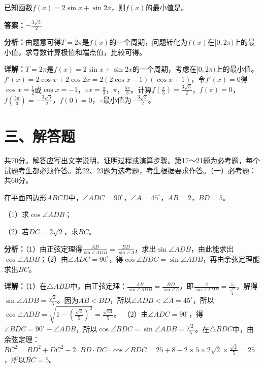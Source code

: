 \begin{question}[points=5]
已知函数$f(x)=2\sin x+\sin 2x$，则$f(x)$的最小值是。
\begin{solution}
\textbf{答案：}$-\frac{3\sqrt{3}}{2}$

\textbf{分析：}由题意可得$T=2\pi$是$f(x)$的一个周期，问题转化为$f(x)$在$[0,2\pi)$上的最小值，求导数计算极值和端点值，比较可得。

\textbf{详解：}$T=2\pi$是$f(x)=2\sin x+\sin2x$的一个周期，考虑在$[0,2\pi)$上的最小值。$f'(x)=2\cos x+2\cos2x=2(2\cos x-1)(\cos x+1)$，令$f'(x)=0$得$\cos x=\frac{1}{2}$或$\cos x=-1$，$\therefore x=\frac{\pi}{3}$，$\pi$，$\frac{5\pi}{3}$。计算$f(\frac{\pi}{3})=\frac{3\sqrt{3}}{2}$，$f(\pi)=0$，$f(\frac{5\pi}{3})=-\frac{3\sqrt{3}}{2}$，$f(0)=0$，$\therefore$最小值为$-\frac{3\sqrt{3}}{2}$。
\end{solution}
\end{question}

\section*{三、解答题}
共70分。解答应写出文字说明、证明过程或演算步骤。第17～21题为必考题，每个试题考生都必须作答。第22、23题为选考题，考生根据要求作答。（一）必考题：共60分。

\begin{question}[points=12]
在平面四边形$ABCD$中，$\angle ADC=90^\circ$，$\angle A=45^\circ$，$AB=2$，$BD=5$。

（1）求$\cos\angle ADB$；

（2）若$DC=2\sqrt{2}$，求$BC$。
\begin{solution}

\textbf{分析：}（1）由正弦定理得$\frac{AB}{\sin\angle ADB}=\frac{BD}{\sin\angle A}$，求出$\sin\angle ADB$，由此能求出$\cos\angle ADB$；（2）由$\angle ADC=90^\circ$，得$\cos\angle BDC=\sin\angle ADB$，再由余弦定理能求出$BC$。

\textbf{详解：}（1）在$\triangle ABD$中，由正弦定理：$\frac{AB}{\sin\angle ADB}=\frac{BD}{\sin\angle A}$，即$\frac{2}{\sin\angle ADB}=\frac{5}{\frac{\sqrt{2}}{2}}$，解得$\sin\angle ADB=\frac{\sqrt{2}}{5}$。因为$AB<BD$，所以$\angle ADB<\angle A=45^\circ$，所以$\cos\angle ADB=\sqrt{1-(\frac{\sqrt{2}}{5})^2}=\frac{\sqrt{23}}{5}$。
（2）由$\angle ADC=90^\circ$，得$\angle BDC=90^\circ-\angle ADB$，所以$\cos\angle BDC=\sin\angle ADB=\frac{\sqrt{2}}{5}$。在$\triangle BDC$中，由余弦定理：$BC^2=BD^2+DC^2-2\cdot BD\cdot DC\cdot\cos\angle BDC=25+8-2\times5\times2\sqrt{2}\times\frac{\sqrt{2}}{5}=25$，所以$BC=5$。
\end{solution}
\end{question}

